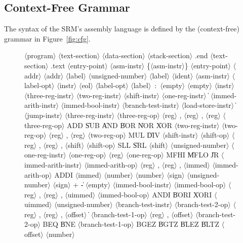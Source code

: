 \documentclass[11pt,letterpaper]{article}
\newcommand{\figref}[1]{Figure~\ref{#1}}  %
\renewcommand{\nonterm}[1]{\mbox{$\langle$\textrm{#1}$\rangle$}}
\renewcommand{\arbno}[1]{\{#1\}}
\begin{document}
\subsection{Context-Free Grammar}

The syntax of the SRM's assembly language is defined by the
(context-free) grammar in \figref{fig:cfg}.

\begin{figure}
\begin{grammar}%
\nonterm{program} \: \nonterm{text-section} \nonterm{data-section} \nonterm{stack-section} .end
\nonterm{text-section} \: .text \nonterm{entry-point} \nonterm{asm-instr} \arbno{\nonterm{asm-instr}}
\nonterm{entry-point} \: \nonterm{addr}
\nonterm{addr} \: \nonterm{label} \| \nonterm{unsigned-number} 
\nonterm{label} \: \nonterm{ident}
\nonterm{asm-instr} \: \nonterm{label-opt} \nonterm{instr} \nonterm{eol}
\nonterm{label-opt} \: \nonterm{label}~:~\| \nonterm{empty}
\nonterm{empty} \:
\nonterm{instr} \: \nonterm{three-reg-instr} \| \nonterm{two-reg-instr} \| \nonterm{shift-instr} \| \nonterm{one-reg-instr}
\> \| \> \nonterm{immed-arith-instr} \| \nonterm{immed-bool-instr} \| \nonterm{branch-test-instr} \| \nonterm{load-store-instr}
\> \| \> \nonterm{jump-instr}
\nonterm{three-reg-instr} \: \nonterm{three-reg-op} \nonterm{reg} , \nonterm{reg} , \nonterm{reg}
\nonterm{three-reg-op} \: ADD \| SUB \| AND \| BOR \| NOR \| XOR
\nonterm{two-reg-instr} \: \nonterm{two-reg-op} \nonterm{reg} , \nonterm{reg}
\nonterm{two-reg-op} \: MUL \| DIV
\nonterm{shift-instr} \: \nonterm{shift-op} \nonterm{reg} , \nonterm{reg} , \nonterm{shift}
\nonterm{shift-op} \: SLL \| SRL
\nonterm{shift} \: \nonterm{unsigned-number}
\nonterm{one-reg-instr} \: \nonterm{one-reg-op} \nonterm{reg}
\nonterm{one-reg-op} \: MFHI \| MFLO \| JR
\nonterm{immed-arith-instr} \: \nonterm{immed-arith-op} \nonterm{reg} , \nonterm{reg} , \nonterm{immed}
\nonterm{immed-arith-op} \: ADDI
\nonterm{immed} \: \nonterm{number}
\nonterm{number} \: \nonterm{sign} \nonterm{unsigned-number}
\nonterm{sign} \: + \| - \| \nonterm{empty}
\nonterm{immed-bool-instr} \: \nonterm{immed-bool-op} \nonterm{reg} , \nonterm{reg} , \nonterm{uimmed}
\nonterm{immed-bool-op} \: ANDI \| BORI \| XORI
\nonterm{uimmed} \: \nonterm{unsigned-number}
\nonterm{branch-test-instr} \: \nonterm{branch-test-2-op} \nonterm{reg} , \nonterm{reg} , \nonterm{offset} 
\> \| \> \nonterm{branch-test-1-op} \nonterm{reg} , \nonterm{offset} 
\nonterm{branch-test-2-op} \: BEQ \| BNE
\nonterm{branch-test-1-op} \: BGEZ \| BGTZ \| BLEZ \| BLTZ 
\nonterm{offset} \: \nonterm{number} 

\end{grammar}
\end{figure}
\end{document}
